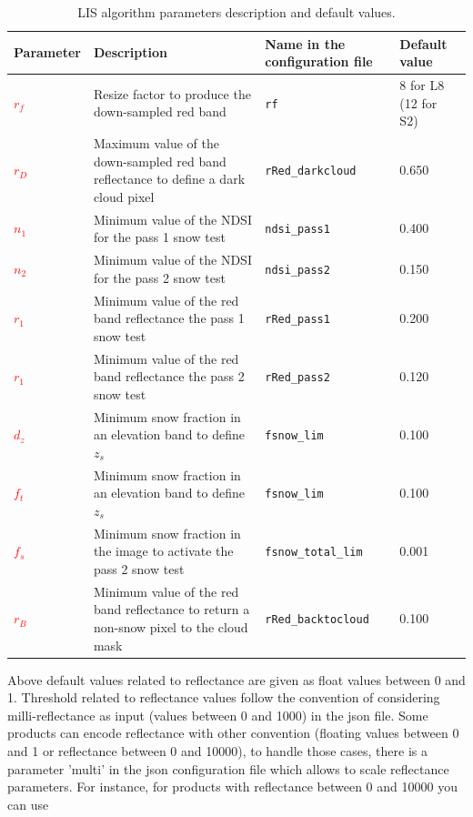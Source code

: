 \documentclass[a4paper]{article}
\begin{document}
\begin{table}[!htbp]
\begin{center}
\begin{tabularx}{\textwidth}{|l X l l|}
\hline
Parameter & Description & Name in the configuration file & Default value\\
\hline
\textcolor{red}{$r_f$} & Resize factor to produce the down-sampled red band & \texttt{rf} & 8 for L8 (12 for S2) \\
\textcolor{red}{$r_D$} & Maximum value of the down-sampled red band reflectance to define a dark cloud pixel & \texttt{rRed\_darkcloud} & 0.650 \\
\textcolor{red}{$n_1$} & Minimum value of the NDSI for the pass 1 snow test & \texttt{ndsi\_pass1} & 0.400\\
\textcolor{red}{$n_2$} & Minimum value of the NDSI for the pass 2 snow test & \texttt{ndsi\_pass2} & 0.150\\
\textcolor{red}{$r_1$} & Minimum value of the red band reflectance the pass 1 snow test  & \texttt{rRed\_pass1} & 0.200 \\
\textcolor{red}{$r_1$} & Minimum value of the red band reflectance the pass 2 snow test  & \texttt{rRed\_pass2} & 0.120 \\
\textcolor{red}{$d_z$} & Minimum snow fraction in an elevation band to define $z_s$ & \texttt{fsnow\_lim} & 0.100 \\
\textcolor{red}{$f_t$} & Minimum snow fraction in an elevation band to define $z_s$ & \texttt{fsnow\_lim} & 0.100 \\
\textcolor{red}{$f_s$} & Minimum snow fraction in the image to activate the pass 2 snow test & \texttt{fsnow\_total\_lim} & 0.001 \\
\textcolor{red}{$r_B$} & Minimum value of the red band reflectance to return a non-snow pixel to the cloud mask & \texttt{rRed\_backtocloud} & 0.100 \\
\hline
\end{tabularx}
\end{center}
\caption{LIS algorithm parameters description and default values.}
\end{table}\label{tab:param}

Above default values related to reflectance are given as float values between 0
and 1. Threshold related to reflectance values follow the convention of
considering milli-reflectance as input (values between 0 and 1000) in the json
file. Some products can encode reflectance with other convention (floating
values between 0 and 1 or reflectance between 0 and 10000), to handle those
cases, there is a parameter 'multi' in the json configuration file which allows
to scale reflectance parameters. For instance, for products with reflectance
between 0 and 10000 you can use
\end{document}
